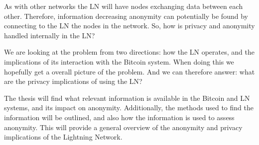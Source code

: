 As with other networks the LN will have nodes exchanging data between each other. Therefore, information decreasing anonymity can potentially be found by connecting to the LN the nodes in the network. So, how is privacy and anonymity handled internally in the LN?

We are looking at the problem from two directions: how the LN operates, and the implications of its interaction with the Bitcoin system. When doing this we hopefully get a overall picture of the problem. And we can therefore answer: 
what are the privacy implications of using the LN?

The thesis will find what relevant information is available in the Bitcoin and LN systems, and its impact on anonymity.
Additionally, the methods used to find the information will be outlined, and also how the information is used to assess anonymity.
This will provide a general overview of the anonymity and privacy implications of the Lightning Network.
